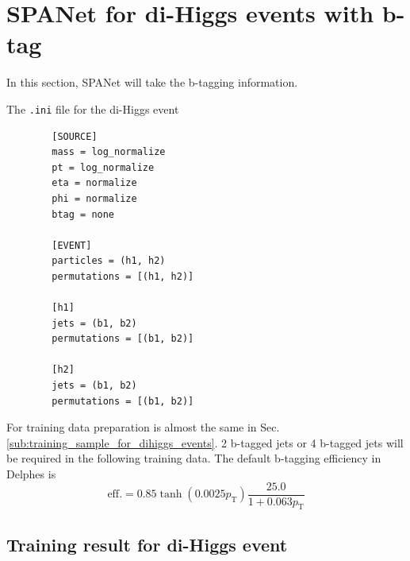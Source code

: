 \documentclass[12pt]{article}
\begin{document}

\section{SPANet for di-Higgs events with b-tag}%
\label{sec:spanet_for_di_higgs_events_with_b_tag}
	In this section, SPANet will take the b-tagging information.

	The \verb+.ini+ file for the di-Higgs event
	\begin{verbatim}
		[SOURCE]
		mass = log_normalize
		pt = log_normalize
		eta = normalize
		phi = normalize
		btag = none

		[EVENT]
		particles = (h1, h2)
		permutations = [(h1, h2)]

		[h1]
		jets = (b1, b2)
		permutations = [(b1, b2)]

		[h2]
		jets = (b1, b2)
		permutations = [(b1, b2)]			
	\end{verbatim}

	For training data preparation is almost the same in Sec.\ref{sub:training_sample_for_dihiggs_events}. 2 b-tagged jets or 4 b-tagged jets will be required in the following training data. The default b-tagging efficiency in Delphes is 
	\begin{equation}
		\text{eff.} = 0.85 \tanh(0.0025p_\text{T}) \frac{25.0}{1+0.063p_\text{T}}		
	\end{equation}

	\subsection{Training result for di-Higgs event}%
	\label{sub:training_result_for_di_higgs_event_b}
\end{document}

